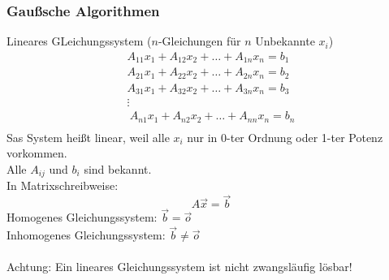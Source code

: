 \documentclass{article}
\begin{document}
\subsubsection{Gaußsche Algorithmen}
Lineares GLeichungssystem ($n$-Gleichungen für $n$ Unbekannte $x_i$)\\
\begin{eqnarray*}
    A_{11}x_1 + A_{12} x_2 + \dots + A_{1n} x_n = b_1\\
    A_{21}x_1 + A_{22} x_2 + \dots + A_{2n} x_n = b_2\\
    A_{31}x_1 + A_{32} x_2 + \dots + A_{3n} x_n = b_3\\
    \vdots\\\
    A_{n1}x_1 + A_{n2} x_2 + \dots + A_{nn} x_n = b_n\\
\end{eqnarray*}
Sas System heißt linear, weil alle $x_i$ nur in 0-ter Ordnung oder 1-ter Potenz vorkommen.\\
Alle $A_{ij}$ und $b_i$ sind bekannt.\\
In Matrixschreibweise:
\begin{equation*}
    A\vec{x} = \vec{b}
\end{equation*}
Homogenes Gleichungssystem: $\vec{b} = \vec{o}$\\
Inhomogenes Gleichungssystem: $\vec{b} \neq \vec{o}$\\\\
Achtung: Ein lineares Gleichungssystem ist nicht zwangsläufig lösbar!\\
\end{document}
